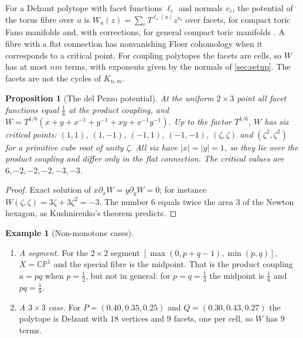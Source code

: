 \documentclass[11pt]{article}
\newtheorem{proposition}[theorem]{Proposition}
\theoremstyle{definition}
\newtheorem{example}[theorem]{Example}
\theoremstyle{remark}
\newcommand{\CP}{\mathbb{CP}}
\begin{document}
For a Delzant polytope with facet functions $\ell_c$ and normals $v_c$, the potential of the torus fibre over
$u$ is $W_u(z)=\sum_cT^{\ell_c(u)}z^{v_c}$ over facets, for compact toric Fano manifolds \cite{ChoOh2006} and,
with corrections, for general compact toric manifolds \cite{FOOO2010}. A fibre with a flat connection has
nonvanishing Floer cohomology when it corresponds to a critical point. For coupling polytopes the facets
are cells, so $W$ has at most $nm$ terms, with exponents given by the normals of \cref{sec:setup}. The facets
are not the cycles of $K_{n,m}$.

\begin{proposition}[The del Pezzo potential]\label{prop:dp6}
At the uniform $2\times3$ point all facet functions equal $\tfrac16$ at the product coupling, and
$W=T^{1/6}(x+y+x^{-1}+y^{-1}+xy+x^{-1}y^{-1})$. Up to the factor $T^{1/6}$, $W$ has six critical points:
$(1,1)$, $(1,-1)$, $(-1,1)$, $(-1,-1)$, $(\zeta,\zeta)$ and $(\zeta^2,\zeta^2)$ for a primitive cube root of unity
$\zeta$. All six have $\lvert x\rvert=\lvert y\rvert=1$, so they lie over the product coupling and differ only in
the flat connection. The critical values are $6,-2,-2,-2,-3,-3$.
\end{proposition}
\begin{proof}
Exact solution of $x\partial_xW=y\partial_yW=0$; for instance $W(\zeta,\zeta)=3\zeta+3\zeta^2=-3$. The number $6$ equals twice the area $3$ of the Newton hexagon,
as Kushnirenko's theorem predicts.
\end{proof}

\begin{example}[Non-monotone cases]
\leavevmode
\begin{enumerate}[label=(\alph*),leftmargin=*]
\item \emph{A segment.} For the $2\times2$ segment $[\max(0,p+q-1),\min(p,q)]$, $X=\CP^1$ and the special fibre is
  the midpoint. That is the product coupling $a=pq$ when $p=\tfrac12$, but not in general: for
  $p=q=\tfrac13$ the midpoint is $\tfrac16$ and $pq=\tfrac19$.
\item \emph{A $3\times3$ case.} For $P=(0.40,0.35,0.25)$ and $Q=(0.30,0.43,0.27)$ the polytope is Delzant with $18$
  vertices and $9$ facets, one per cell, so $W$ has $9$ terms.
\end{enumerate}
\end{example}
\end{document}
